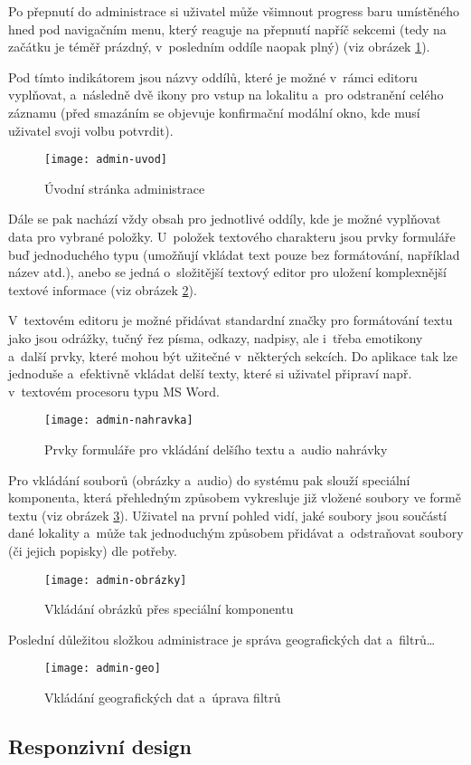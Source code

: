 Po přepnutí do administrace si uživatel může všimnout progress baru umístěného hned pod navigačním menu, který reaguje na přepnutí napříč sekcemi (tedy na začátku je téměř prázdný, v~posledním oddíle naopak plný) (viz obrázek \ref{admin-uvod}).

Pod tímto indikátorem jsou názvy oddílů, které je možné v~rámci editoru vyplňovat, a~následně dvě ikony pro vstup na lokalitu a~pro odstranění celého záznamu (před smazáním se objevuje konfirmační modální okno, kde musí uživatel svoji volbu potvrdit).

\begin{figure}
    \centering
    \texttt{[image: admin-uvod]}  
    \caption{Úvodní stránka administrace}
    \label{admin-uvod}
\end{figure}

Dále se pak nachází vždy obsah pro jednotlivé oddíly, kde je možné vyplňovat data pro vybrané položky. U~položek textového charakteru jsou prvky formuláře buď jednoduchého typu (umožňují vkládat text pouze bez formátování, například název atd.), anebo se jedná o~složitější textový editor pro uložení komplexnější textové informace (viz obrázek \ref{admin-nahravka}).

V~textovém editoru je možné přidávat standardní značky pro formátování textu jako jsou odrážky, tučný řez písma, odkazy, nadpisy, ale i~třeba emotikony a~další prvky, které mohou být užitečné v~některých sekcích. Do aplikace tak lze jednoduše a~efektivně vkládat delší texty, které si uživatel připraví např. v~textovém procesoru typu MS Word.

\begin{figure}
    \centering
    \texttt{[image: admin-nahravka]}  
    \caption{Prvky formuláře pro vkládání delšího textu a~audio nahrávky}
    \label{admin-nahravka}
\end{figure}

Pro vkládání souborů (obrázky a~audio) do systému pak slouží speciální komponenta, která přehledným způsobem vykresluje již vložené soubory ve formě textu (viz obrázek \ref{admin-obrazky}). Uživatel na první pohled vidí, jaké soubory jsou součástí dané lokality a~může tak jednoduchým způsobem přidávat a~odstraňovat soubory (či jejich popisky) dle potřeby.

\begin{figure}
    \centering
    \texttt{[image: admin-obrázky]}  
    \caption{Vkládání obrázků přes speciální komponentu}
    \label{admin-obrazky}
\end{figure}

Poslední důležitou složkou administrace je správa geografických dat a~filtrů\ldots{}

\begin{figure}
    \centering
    \texttt{[image: admin-geo]}  
    \caption{Vkládání geografických dat a~úprava filtrů}
    \label{admin-geo}
\end{figure}

\hypertarget{responzivnuxed-design}{%
\subsection{Responzivní design}\label{responzivnuxed-design}}
